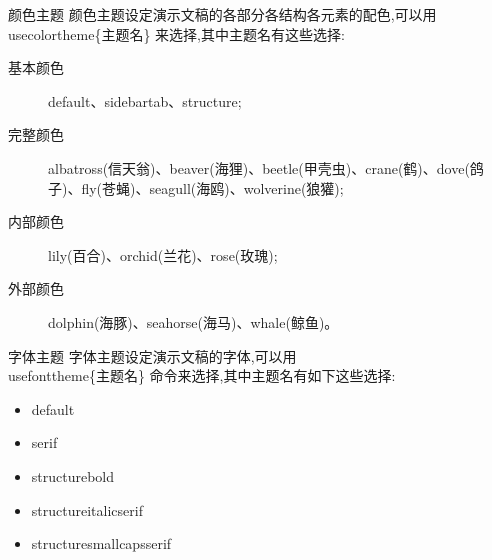 \begin{frame}{颜色主题}
颜色主题设定演示文稿的各部分各结构各元素的配色,可以用\\usecolortheme\{主题名\} 来选择,其中主题名有这些选择:

\begin{description}
    \item [基本颜色] default、sidebartab、structure;
    \item [完整颜色] albatross(信天翁)、beaver(海狸)、beetle(甲壳虫)、crane(鹤)、dove(鸽子)、fly(苍蝇)、seagull(海鸥)、wolverine(狼獾);
    \item [内部颜色] lily(百合)、orchid(兰花)、rose(玫瑰);
    \item [外部颜色] dolphin(海豚)、seahorse(海马)、whale(鲸鱼)。
\end{description}
\end{frame}

\begin{frame}{字体主题}
字体主题设定演示文稿的字体,可以用 \\usefonttheme\{主题名\} 命令来选择,其中主题名有如下这些选择:
\begin{itemize}
    \item default
    \item serif
    \item structurebold
    \item structureitalicserif
    \item structuresmallcapsserif
\end{itemize}
\end{frame}

\fi


